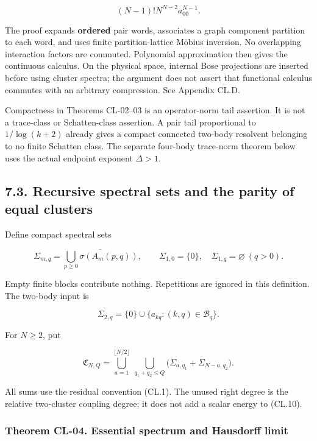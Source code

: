 \[
(N-1)!N^{N-2}a_{00}^{N-1}.
\tag{CL.8}
\]

The proof expands \textbf{ordered} pair words, associates a graph component partition to each word, and uses finite partition-lattice Möbius inversion. No overlapping interaction factors are commuted. Polynomial approximation then gives the continuous calculus. On the physical space, internal Bose projections are inserted before using cluster spectra; the argument does not assert that functional calculus commutes with an arbitrary compression. See Appendix CL.D.

Compactness in Theorems CL-02--03 is an operator-norm tail assertion. It is not a trace-class or Schatten-class assertion. A pair tail proportional to \(1/\log(k+2)\) already gives a compact connected two-body resolvent belonging to no finite Schatten class. The separate four-body trace-norm theorem below uses the actual endpoint exponent \(\Delta>1\).

\hypertarget{recursive-spectral-sets-and-the-parity-of-equal-clusters}{%
\subsection{7.3. Recursive spectral sets and the parity of equal clusters}\label{recursive-spectral-sets-and-the-parity-of-equal-clusters}}

Define compact spectral sets

\[
\Sigma_{m,q}=\overline{\bigcup_{p\geq0}\sigma(A_m(p,q))},
\qquad \Sigma_{1,0}=\{0\},\quad \Sigma_{1,q}=\varnothing\ (q>0).
\tag{CL.9}
\]

Empty finite blocks contribute nothing. Repetitions are ignored in this definition. The two-body input is

\[
\Sigma_{2,q}=\{0\}\cup\{a_{kq}:(k,q)\in\mathcal B_q\}.
\]

For \(N\geq2\), put

\[
\mathfrak C_{N,Q}=
\bigcup_{a=1}^{\lfloor N/2\rfloor}
\ \bigcup_{q_1+q_2\leq Q}
\bigl(\Sigma_{a,q_1}+\Sigma_{N-a,q_2}\bigr).
\tag{CL.10}
\]

All sums use the residual convention (CL.1). The unused right degree is the relative two-cluster coupling degree; it does not add a scalar energy to (CL.10).

\hypertarget{theorem-cl-04.-essential-spectrum-and-hausdorff-limit}{%
\subsubsection{Theorem CL-04. Essential spectrum and Hausdorff limit}\label{theorem-cl-04.-essential-spectrum-and-hausdorff-limit}}

